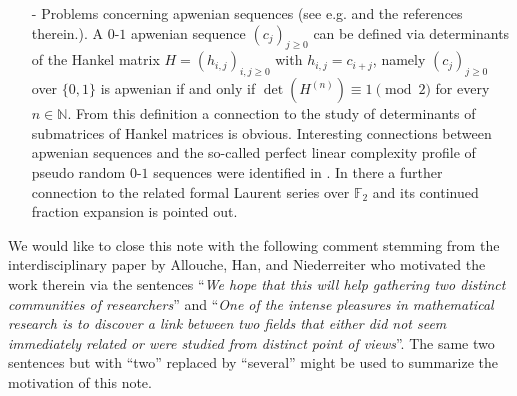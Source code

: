 \documentclass{article}
\newcommand{\NN}{\mathbb N}
\newcommand{\ZZ}{\mathbb Z}
\newcommand{\FF}{\mathbb F}
\begin{document}
\begin{itemize}
	\item[-] Problems concerning apwenian sequences (see e.g. \cite{GHW} and the references therein.). A $0$-$1$ apwenian sequence $(c_j)_{j\geq 0}$ can be defined via determinants of the Hankel matrix $H=(h_{i,j})_{i,j\geq 0}$ with $h_{i,j}=c_{i+j}$, namely $(c_j)_{j\geq 0}$ over $\{0,1\}$ is apwenian if and only if $\det(H^{(n)})\equiv 1\pmod 2$ for every $n\in\NN$. From this definition a connection to the study of determinants of submatrices of Hankel matrices is obvious. Interesting connections between apwenian sequences and the so-called perfect linear complexity profile of pseudo random $0$-$1$ sequences were identified in \cite{Alletal2}. In there a further connection to the related formal Laurent series over $\FF_2$ and its continued fraction expansion is pointed out. 
\end{itemize}

We would like to close this note with the following comment stemming from the interdisciplinary paper \cite{Alletal2} by Allouche, Han, and Niederreiter who motivated the work therein via the sentences ``\textit{We hope that this will help gathering two distinct communities of researchers}'' and ``\textit{One of the intense pleasures in mathematical research is to discover a link between two fields that either did not seem immediately related or were studied from distinct point of views}''. The same two sentences but with ``two'' replaced by ``several'' might be used to summarize the motivation of this note. 


\end{document}
